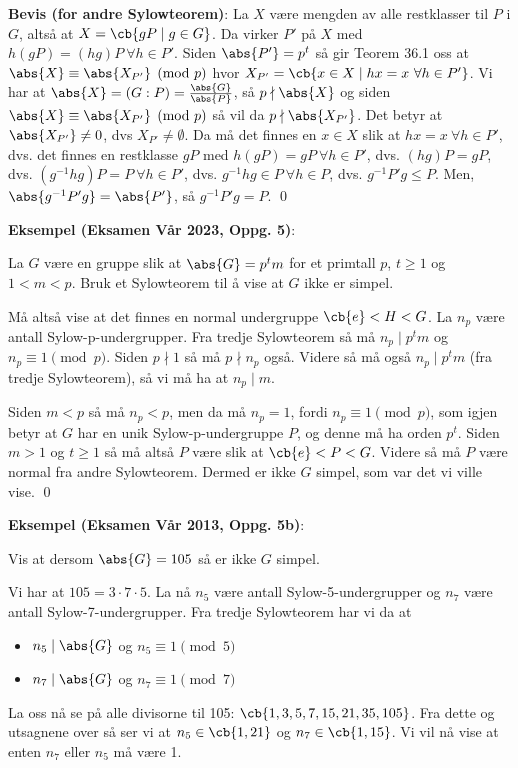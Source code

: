 \textbf{Bevis (for andre Sylowteorem)}: La $X$ være mengden av alle restklasser til $P$ i $G$,
altså at $X = \cb{gP\mid g\in G}$. Da virker $P'$ på $X$ med $h(gP)=(hg)P\ \forall h\in P'$. 
Siden $\abs{P'}=p^t$ så gir Teorem 36.1 oss at $\abs{X}\equiv \abs{X_{P'}} \pmod{p}$ hvor
$X_{P'}=\cb{x\in X\mid hx = x\ \forall h\in P'}$. Vi har at 
$\abs{X}=(G:P)=\frac{\abs{G}}{\abs{P}}$, så $p\nmid \abs{X}$ og siden 
$\abs{X}\equiv\abs{X_{P'}}\pmod{p}$ så vil da $p\nmid \abs{X_{P'}}$. Det betyr at 
$\abs{X_{P'}}\neq 0$, dvs $X_{P'}\neq \emptyset$. Da må det finnes en $x\in X$ slik at
$hx=x\ \forall h\in P'$, dvs. det finnes en restklasse $gP$ med $h(gP)=gP\ \forall h\in P'$, 
dvs. $(hg)P=gP$, dvs. $(g^{-1}hg)P=P\ \forall h\in P'$, dvs. $g^{-1}hg\in P\ \forall h\in P$,
dvs. $g^{-1}P'g\leq P$. Men, $\abs{g^{-1}P'g}=\abs{P'}$, så $g^{-1}P'g=P$. \qed 

\textbf{Eksempel (Eksamen Vår 2023, Oppg. 5)}:

La $G$ være en gruppe slik at $\abs{G}=p^tm$ for et primtall $p$, $t\geq 1$ og $1 < m < p$. Bruk
et Sylowteorem til å vise at $G$ ikke er simpel.

Må altså vise at det finnes en normal undergruppe $\cb{e}<H<G$. La $n_p$ være antall 
Sylow-p-undergrupper. Fra tredje Sylowteorem så må $n_p \mid p^tm$ og $n_p \equiv 1 \pmod{p}$.
Siden $p \nmid 1$ så må $p \nmid n_p$ også. Videre så må også $n_p \mid p^tm$ (fra tredje 
Sylowteorem), så vi må ha at $n_p \mid m$. 

Siden $m < p$ så må $n_p < p$, men da må $n_p = 1$, fordi $n_p \equiv 1 \pmod{p}$, som igjen
betyr at $G$ har en unik Sylow-p-undergruppe $P$, og denne må ha orden $p^t$. Siden $m > 1$ og
$t \geq 1$ så må altså $P$ være slik at $\cb{e}<P<G$. Videre så må $P$ være normal fra andre
Sylowteorem. Dermed er ikke $G$ simpel, som var det vi ville vise. \qed

\textbf{Eksempel (Eksamen Vår 2013, Oppg. 5b)}:

Vis at dersom $\abs{G} = 105$ så er ikke $G$ simpel.

Vi har at $105 = 3\cdot 7\cdot 5$. La nå $n_5$ være antall Sylow-5-undergrupper og $n_7$ være
antall Sylow-7-undergrupper. Fra tredje Sylowteorem har vi da at
\begin{itemize}
  \item $n_5 \mid \abs{G}$ og $n_5 \equiv 1 \pmod{5}$
  \item $n_7 \mid \abs{G}$ og $n_7 \equiv 1 \pmod{7}$
\end{itemize}
La oss nå se på alle divisorne til 105: $\cb{1, 3, 5, 7, 15, 21, 35, 105}$. Fra dette og utsagnene
over så ser vi at $n_5\in \cb{1, 21}$ og $n_7\in \cb{1, 15}$. Vi vil nå vise at enten $n_7$ eller 
$n_5$ må være 1.


